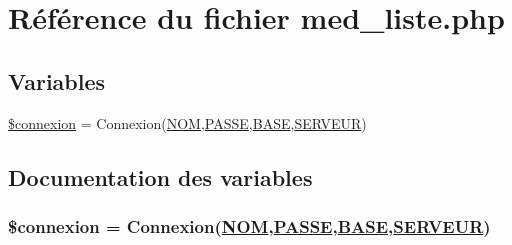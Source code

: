 \hypertarget{med__liste_8php}{
\section{R\'{e}f\'{e}rence du fichier med\_\-liste.php}
\label{med__liste_8php}
}
\subsection*{Variables}
\begin{CompactItemize}
\item 
\hyperlink{med__liste_8php_a0}{\$connexion} = Connexion(\hyperlink{pma__connect_8php_a0}{NOM},\hyperlink{pma__connect_8php_a1}{PASSE},\hyperlink{pma__connect_8php_a3}{BASE},\hyperlink{pma__connect_8php_a2}{SERVEUR})
\end{CompactItemize}


\subsection{Documentation des variables}
\hypertarget{med__liste_8php_a0}{
\subsubsection[\$connexion]{\setlength{\rightskip}{0pt plus 5cm}\$connexion = Connexion(\hyperlink{pma__connect_8php_a0}{NOM},\hyperlink{pma__connect_8php_a1}{PASSE},\hyperlink{pma__connect_8php_a3}{BASE},\hyperlink{pma__connect_8php_a2}{SERVEUR})}}
\label{med__liste_8php_a0}


